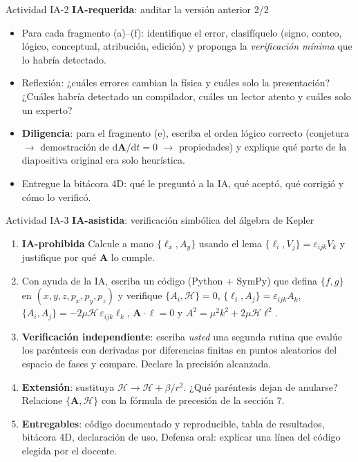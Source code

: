 \documentclass[aspectratio=169]{beamer}
\newcommand{\dd}{\mathrm{d}}
\newcommand{\vA}{\mathbf A}
\newcommand{\vl}{\boldsymbol\ell}
\newcommand{\PB}[2]{\{#1,#2\}}
\newcommand{\Hc}{\mathcal H}
\newcommand{\IAprohibida}{\colorbox{red!20}{\scriptsize\textbf{IA-prohibida}}}
\newcommand{\IAasistida}{\colorbox{yellow!30}{\scriptsize\textbf{IA-asistida}}}
\newcommand{\IArequerida}{\colorbox{green!20}{\scriptsize\textbf{IA-requerida}}}
\begin{document}
\begin{frame}{Actividad IA-2 \IArequerida: auditar la versión anterior 2/2}
\begin{itemize}
  \item<1-> Para cada fragmento (a)–(f): identifique el error, clasifíquelo (signo, conteo, lógico,
        conceptual, atribución, edición) y proponga la \emph{verificación mínima} que lo
        habría detectado.
  \item<2-> Reflexión: ¿cuáles errores cambian la física y cuáles solo la presentación?
        ¿Cuáles habría detectado un compilador, cuáles un lector atento y cuáles solo un experto?
  \item<3-> \textbf{Diligencia}: para el fragmento (e), escriba el orden lógico correcto
        (conjetura $\to$ demostración de $\dd\vA/\dd t=0$ $\to$ propiedades) y explique qué
        parte de la diapositiva original era solo heurística.
  \item<4-> Entregue la bitácora 4D: qué le preguntó a la IA, qué aceptó, qué corrigió y cómo
        lo verificó.
\end{itemize}
\end{frame}

\begin{frame}{Actividad IA-3 \IAasistida: verificación simbólica del álgebra de Kepler}
\small
\begin{enumerate}
  \item<1-> \IAprohibida{} Calcule a mano $\PB{\ell_x}{A_y}$ usando el lema
        $\PB{\ell_i}{V_j}=\varepsilon_{ijk}V_k$ y justifique por qué $\vA$ lo cumple.
  \item<2-> Con ayuda de la IA, escriba un código (Python + SymPy) que defina $\PB{f}{g}$ en
        $(x,y,z,p_x,p_y,p_z)$ y verifique $\PB{A_i}{\Hc}=0$, $\PB{\ell_i}{A_j}=\varepsilon_{ijk}A_k$,
        $\PB{A_i}{A_j}=-2\mu\Hc\,\varepsilon_{ijk}\ell_k$, $\vA\cdot\vl=0$ y
        $A^{2}=\mu^{2}k^{2}+2\mu\Hc\ell^{2}$.
  \item<3-> \textbf{Verificación independiente}: escriba \emph{usted} una segunda rutina que
        evalúe los paréntesis con derivadas por diferencias finitas en puntos aleatorios del
        espacio de fases y compare. Declare la precisión alcanzada.
  \item<4-> \textbf{Extensión}: sustituya $\Hc\to\Hc+\beta/r^{2}$. ¿Qué paréntesis dejan de
        anularse? Relacione $\PB{\vA}{\Hc}$ con la fórmula de precesión de la sección 7.
  \item<5-> \textbf{Entregables}: código documentado y reproducible, tabla de resultados,
        bitácora 4D, declaración de uso. Defensa oral: explicar una línea del código elegida
        por el docente.
\end{enumerate}
\end{frame}
\end{document}
